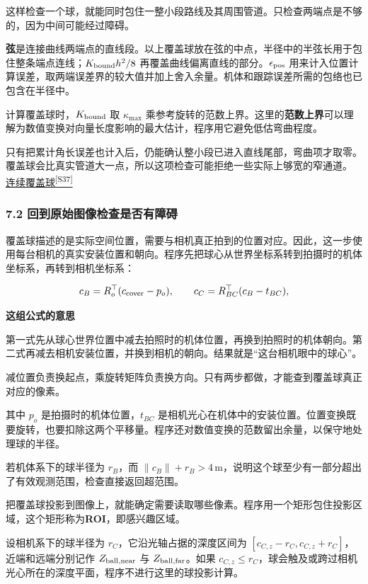 \documentclass[12pt,a4paper]{article}
\numberwithin{equation}{topic}
\newcommand{\sourceref}[2]{\hyperlink{source-#1}{#2\textsuperscript{[#1]}}}
\begin{document}
这样检查一个球，就能同时包住一整小段路线及其周围管道。只检查两端点是不够的，因为中间可能经过障碍。


\textbf{弦}是连接曲线两端点的直线段。以上覆盖球放在弦的中点，半径中的半弦长用于包住整条端点连线；\(K_{\rm bound}h^2/8\) 再覆盖曲线偏离直线的部分。\(\epsilon_{\rm pos}\) 用来计入位置计算误差，取两端误差界的较大值并加上舍入余量。机体和跟踪误差所需的包络也已包含在半径中。

计算覆盖球时，\(K_{\rm bound}\) 取 \(\kappa_{\max}\) 乘参考旋转的范数上界。这里的\textbf{范数上界}可以理解为数值变换对向量长度影响的最大估计，程序用它避免低估弯曲程度。

只有把累计角长误差也计入后，仍能确认整小段已进入直线尾部，弯曲项才取零。覆盖球会比真实管道大一点，所以这项检查可能拒绝一些实际上够宽的窄通道。 \sourceref{S37}{连续覆盖球}

\subsubsection*{7.2 回到原始图像检查是否有障碍}

覆盖球描述的是实际空间位置，需要与相机真正拍到的位置对应。因此，这一步使用每台相机的真实安装位置和朝向。程序先把球心从世界坐标系转到拍摄时的机体坐标系，再转到相机坐标系：

\begin{equation}
\label{eq:frames}
c_B=R_o^\top(c_{\rm cover}-p_o),\qquad
c_C=R_{BC}^\top(c_B-t_{BC}),
\end{equation}

\noindent\textbf{这组公式的意思}\par\nobreak
第一式先从球心世界位置中减去拍照时的机体位置，再换到拍照时的机体朝向。第二式再减去相机安装位置，并换到相机的朝向。结果就是“这台相机眼中的球心”。

减位置负责换起点，乘旋转矩阵负责换方向。只有两步都做，才能查到覆盖球真正对应的像素。


其中 \(p_o\) 是拍摄时的机体位置，\(t_{BC}\) 是相机光心在机体中的安装位置。位置变换既要旋转，也要扣除这两个平移量。程序还对数值变换的范数留出余量，以保守地处理球的半径。

若机体系下的球半径为 \(r_B\)，而 \(\|c_B\|+r_B>4\,\mathrm m\)，说明这个球至少有一部分超出了有效观测范围，检查直接返回超范围。

把覆盖球投影到图像上，就能确定需要读取哪些像素。程序用一个矩形包住投影区域，这个矩形称为\textbf{ROI}，即感兴趣区域。

设相机系下的球半径为 \(r_C\)，它沿光轴占据的深度区间为 \([c_{C,z}-r_C,c_{C,z}+r_C]\)，近端和远端分别记作 \(Z_{\rm ball,near}\) 与 \(Z_{\rm ball,far}\)。如果 \(c_{C,z}\le r_C\)，球会触及或跨过相机光心所在的深度平面，程序不进行这里的球投影计算。
\end{document}

